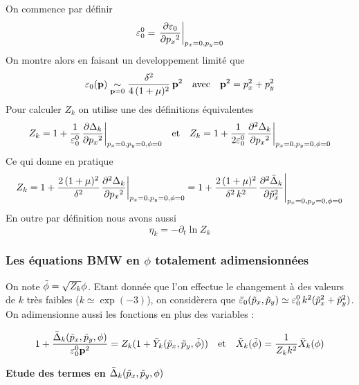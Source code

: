 \documentclass[10pt]{article}
\begin{document}
On commence par définir 
\begin{equation}
\varepsilon_0^0 ={\left. \frac{\partial \varepsilon_0}{ \partial {{p_x}^2}} \right|}_{p_x = 0, p_y = 0}
\end{equation}
On montre alors en faisant un developpement limité que
\begin{equation}
\varepsilon_0({\bf p})  \underset{{\bf p} = 0}{\sim} \frac{\delta^2}{4\,(1+\mu)^2} \, {\bf p}^2 \quad \text{avec} \quad {\bf p}^2 = p_x^2 + p_y^2
\end{equation}
Pour calculer $Z_k$ on utilise une des définitions équivalentes
\begin{equation}
Z_k = 1+\frac{1}{\varepsilon_0^0}{\left. \frac{\partial \Delta_k}{\partial {p_x}^2} \right|}_{p_x = 0, p_y = 0, \phi = 0}  \quad \text{et} \quad 
Z_k = 1+\frac{1}{2\varepsilon_0^0}{\left. \frac{\partial^2 \Delta_k}{\partial {p_x}^2} \right|}_{p_x = 0, p_y = 0, \phi = 0} 
\end{equation}
Ce qui donne en pratique
\begin{equation}
Z_k = 1+\frac{2\,(1+\mu)^2}{\delta^2}{\left. \frac{\partial^2 \Delta_k}{\partial {p_x}^2} \right|}_{p_x = 0, p_y = 0, \phi = 0} = 1+\frac{2\,(1+\mu)^2}{\delta^2\, k^2}{\left. \frac{\partial^2 \bar{\Delta}_k}{\partial {\tilde{p}_x}^2} \right|}_{p_x = 0, p_y = 0, \phi = 0}
\end{equation}
En outre par définition nous avons aussi
\begin{equation}
\eta_k = -\partial_t \ln Z_k 
\end{equation}

\vspace*{11pt}
\subsubsection{Les équations BMW en $\phi$ totalement adimensionnées}

On note $\tilde{\phi} = \sqrt{Z_k}\phi$. Etant donnée que l'on effectue le changement à des valeurs de $k$ très faibles ($k \simeq \exp(-3)$), on considèrera que $\bar{\varepsilon}_0(\tilde{p}_x,\tilde{p}_y) \simeq \varepsilon_0^0\,k^2(\tilde{p}_x^2+\tilde{p}_y^2)$. On adimensionne aussi les fonctions en plus des variables :

\begin{equation*}
1 + \frac{\bar{\Delta}_k(\tilde{p}_x, \tilde{p}_y,\phi)}{\varepsilon_0^0 {\bf p}^2} = Z_k(1+\tilde{Y}_k(\tilde{p}_x, \tilde{p}_y,\tilde{\phi})) \quad \text{et} \quad \tilde{X}_k(\tilde{\phi}) = \frac{1}{Z_k k^2} \bar{X}_k(\phi)
\end{equation*}


\vspace*{11pt}
\noindent
\textbf{Etude des termes en $\bar{\Delta}_k(\tilde{p}_x, \tilde{p}_y,\phi)$} \\
\end{document}
